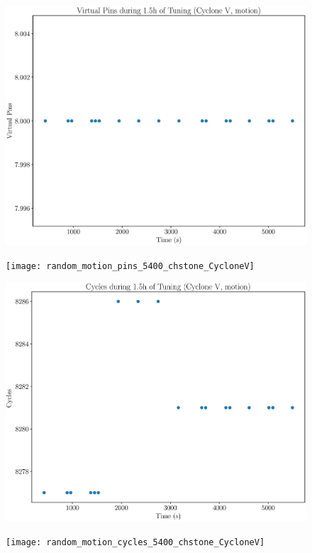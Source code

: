 \documentclass[12pt, a4paper]{article}
\begin{document}
\begin{figure}[htpb]
    \begin{minipage}{.48\textwidth}
        \includegraphics[scale=.25]{motion_pins_5400_chstone_CycloneV}
    \end{minipage}%
    \hfill
    \begin{minipage}{.48\textwidth}
        \texttt{[image: random\_motion\_pins\_5400\_chstone\_CycloneV]}
    \end{minipage}%

    \begin{minipage}{.48\textwidth}
        \includegraphics[scale=.25]{motion_cycles_5400_chstone_CycloneV}
    \end{minipage}%
    \hfill
    \begin{minipage}{.48\textwidth}
        \texttt{[image: random\_motion\_cycles\_5400\_chstone\_CycloneV]}
    \end{minipage}%
\end{figure}
\end{document}
